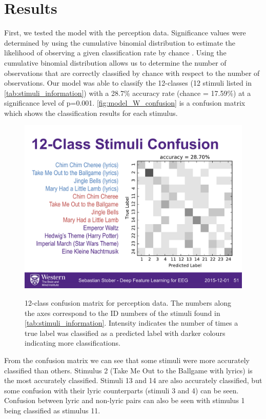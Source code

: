 \section{Results}
First, we tested the model with the perception data. 
Significance values were determined by using the cumulative binomial distribution to estimate the likelihood of observing a given classification rate by chance \cite{Combrisson2015}. 
Using the cumulative binomial distribution allows us to determine the number of observations that are correctly classified by chance with respect to the number of observations.
Our model was able to classify the 12-classes (12 stimuli listed in \autoref{tab:stimuli_information}) with a 28.7\% accuracy rate (chance = 17.59\%) at a significance level of p=0.001.
\autoref{fig:model_W_confusion} is a confusion matrix which shows the classification results for each stimulus.
\begin{figure}[htb] 
  \begin{center}
    \includegraphics[width=.75\textwidth,keepaspectratio=true]{Figures/model_W_confusion-512}
   \\\vspace{-0.8em}
    \caption{12-class confusion matrix for perception data. The numbers along the axes correspond to the ID numbers of the stimuli found in \autoref{tab:stimuli_information}. Intensity indicates the number of times a true label was classified as a predicted label with darker colours indicating more classifications.}
    \label{fig:model_W_confusion}
  \end{center}
\end{figure}
From the confusion matrix we can see that some stimuli were more accurately classified than others. 
Stimulus 2 (Take Me Out to the Ballgame with lyrics) is the most accurately classified. 
Stimuli 13 and 14 are also accurately classified, but some confusion with their lyric counterparts (stimuli 3 and 4) can be seen.
Confusion between lyric and non-lyric pairs can also be seen with stimulus 1 being classified as stimulus 11.

